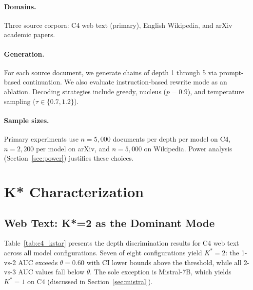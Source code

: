 \documentclass[11pt,a4paper]{article}
\begin{document}
\paragraph{Domains.} Three source corpora: C4 web text (primary), English Wikipedia, and arXiv academic papers.

\paragraph{Generation.} For each source document, we generate chains of depth 1 through 5 via prompt-based continuation. We also evaluate instruction-based rewrite mode as an ablation. Decoding strategies include greedy, nucleus ($p{=}0.9$), and temperature sampling ($\tau \in \{0.7, 1.2\}$).

\paragraph{Sample sizes.} Primary experiments use $n{=}5{,}000$ documents per depth per model on C4, $n{=}2{,}200$ per model on arXiv, and $n{=}5{,}000$ on Wikipedia. Power analysis (Section~\ref{sec:power}) justifies these choices.


\section{K* Characterization}
\label{sec:kstar}

\subsection{Web Text: K*=2 as the Dominant Mode}

Table~\ref{tab:c4_kstar} presents the depth discrimination results for C4 web text across all model configurations. Seven of eight configurations yield $K^*{=}2$: the 1-vs-2 AUC exceeds $\theta{=}0.60$ with CI lower bounds above the threshold, while all 2-vs-3 AUC values fall below $\theta$. The sole exception is Mistral-7B, which yields $K^*{=}1$ on C4 (discussed in Section~\ref{sec:mistral}).
\end{document}

